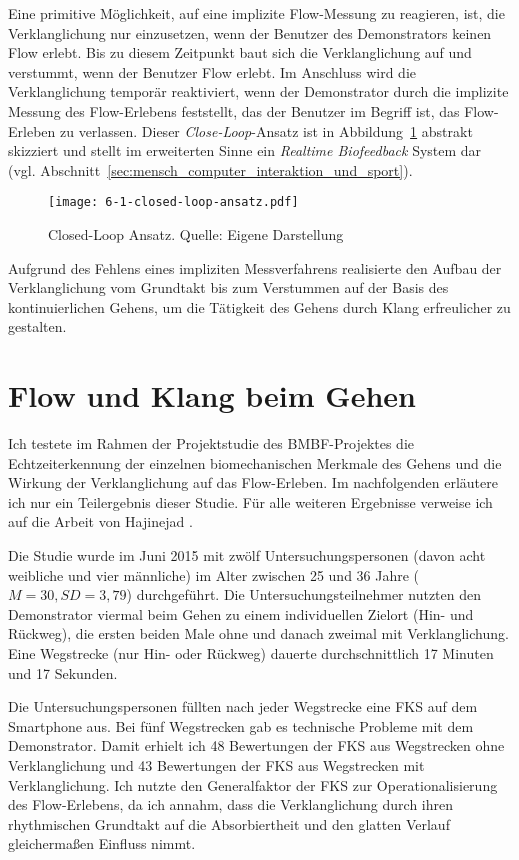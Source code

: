 Eine primitive Möglichkeit, auf eine implizite Flow-Messung zu reagieren, ist, die Verklanglichung nur einzusetzen, wenn der Benutzer des Demonstrators keinen Flow erlebt. Bis zu diesem Zeitpunkt baut sich die Verklanglichung auf und verstummt, wenn der Benutzer Flow erlebt. Im Anschluss wird die Verklanglichung temporär reaktiviert, wenn der Demonstrator durch die implizite Messung des Flow-Erlebens feststellt, das der Benutzer im Begriff ist, das Flow-Erleben zu verlassen. Dieser \emph{Close-Loop}-Ansatz ist in Abbildung~\ref{fig:6_1_closed_loop_ansatz} abstrakt skizziert \citep[vgl.][S.~474]{Calvo2015} und stellt im erweiterten Sinne ein \emph{Realtime Biofeedback} System dar (vgl. Abschnitt~\ref{sec:mensch_computer_interaktion_und_sport}). 

\begin{figure}[t]
	\centering
		\texttt{[image: 6-1-closed-loop-ansatz.pdf]}
	\caption[Closed-Loop Ansatz]{Closed-Loop Ansatz. Quelle: Eigene Darstellung}
	\label{fig:6_1_closed_loop_ansatz}
\end{figure}

Aufgrund des Fehlens eines impliziten Messverfahrens realisierte \citet{Hajinejad} den Aufbau der Verklanglichung vom Grundtakt bis zum Verstummen auf der Basis des kontinuierlichen Gehens, um die Tätigkeit des Gehens durch Klang erfreulicher zu gestalten.

\section{Flow und Klang beim Gehen}
Ich testete im Rahmen der Projektstudie des \acs{BMBF}-Projektes die Echtzeiterkennung der einzelnen biomechanischen Merkmale des Gehens und die Wirkung der Verklanglichung auf das Flow-Erleben. Im nachfolgenden erläutere ich nur ein Teilergebnis dieser Studie. Für alle weiteren Ergebnisse verweise ich auf die Arbeit von Hajinejad \citet{Hajinejad}. 

Die Studie wurde im Juni 2015 mit zwölf Untersuchungspersonen (davon acht weibliche und vier männliche) im Alter zwischen 25 und 36 Jahre ($M = 30, SD = 3,79$) durchgeführt. Die Untersuchungsteilnehmer nutzten den Demonstrator viermal beim Gehen zu einem individuellen Zielort (Hin- und Rückweg), die ersten beiden Male ohne und danach zweimal mit Verklanglichung. Eine Wegstrecke (nur Hin- oder Rückweg) dauerte durchschnittlich 17 Minuten und 17 Sekunden. 

Die Untersuchungspersonen füllten nach jeder Wegstrecke eine \ac{FKS} auf dem Smartphone aus. Bei fünf Wegstrecken gab es technische Probleme mit dem Demonstrator. Damit erhielt ich 48 Bewertungen der \ac{FKS} aus Wegstrecken ohne Verklanglichung und 43 Bewertungen der \ac{FKS} aus Wegstrecken mit Verklanglichung. Ich nutzte den Generalfaktor der \ac{FKS} zur Operationalisierung des Flow-Erlebens, da ich annahm, dass die Verklanglichung durch ihren rhythmischen Grundtakt auf die Absorbiertheit und den glatten Verlauf gleichermaßen Einfluss nimmt.

